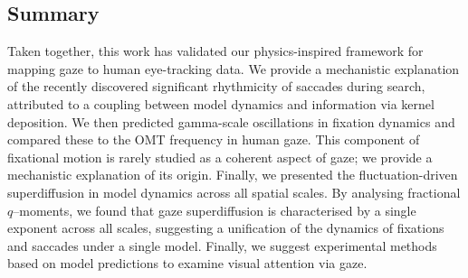 \subsection*{Summary}
Taken together, this work has validated our physics-inspired framework for mapping gaze to human eye-tracking data. We provide a mechanistic explanation of the recently discovered significant rhythmicity of saccades during search, attributed to a coupling between model dynamics and information via kernel deposition. We then predicted gamma-scale oscillations in fixation dynamics and compared these to the OMT frequency in human gaze. This component of fixational motion is rarely studied as a coherent aspect of gaze; we provide a mechanistic explanation of its origin. Finally, we presented the fluctuation-driven superdiffusion in model dynamics across all spatial scales. By analysing fractional $q$--moments, we found that gaze superdiffusion is characterised by a single exponent across all scales, suggesting a unification of the dynamics of fixations and saccades under a single model. Finally, we suggest experimental methods based on model predictions to examine visual attention via gaze.